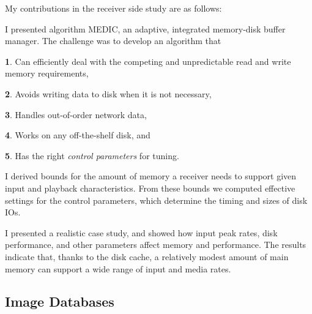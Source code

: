 My contributions in the receiver side study are as follows:
\begin{jlist}
\item
I presented algorithm MEDIC, an adaptive, integrated memory-disk
buffer manager.  The challenge was to develop an algorithm that
\begin{nlist}
\item {\bf 1}. Can efficiently deal with the competing and
unpredictable read and write memory requirements,
\item {\bf 2}. Avoids writing data to disk when it is not necessary,
\item {\bf 3}. Handles out-of-order network data,
\item {\bf 4}. Works on any off-the-shelf disk, and
\item {\bf 5}. Has the right {\it control parameters} for tuning.
\end{nlist}
\item
I derived bounds for the amount of memory a receiver needs
to support given input and playback characteristics.
From these bounds we computed effective settings for
the control parameters, which determine the timing
and sizes of disk IOs.        
\item
I presented a realistic case study, and showed
how input peak rates, disk performance, and other parameters
affect memory and performance.
The results indicate that, thanks to the disk cache,
a relatively modest amount of main memory can support a wide range
of input and media rates.
\end{jlist}

\subsection{Image Databases}

